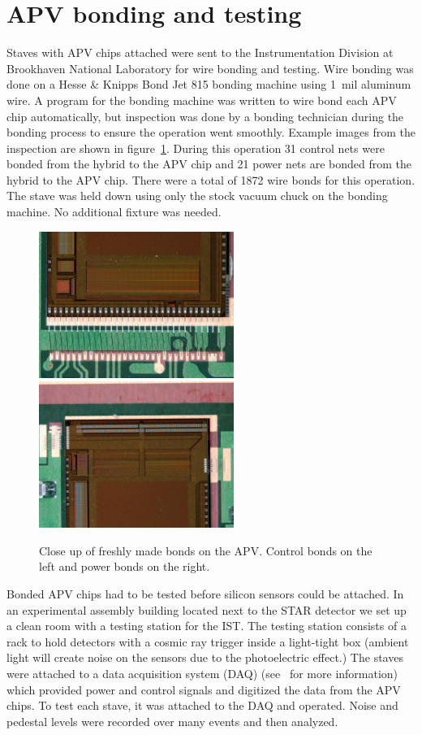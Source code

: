 \documentclass[preprint,12pt]{elsarticle}
\begin{document}
\section{APV bonding and testing}
Staves with APV chips attached were sent to the Instrumentation Division at
Brookhaven National Laboratory for wire bonding and testing. Wire bonding was
done on a Hesse \& Knipps Bond Jet 815 bonding machine using 1~mil aluminum
wire. A program for the bonding machine was written to wire bond each APV chip
automatically, but inspection was done by a bonding technician during the
bonding process to ensure the operation went smoothly.  Example images from the
inspection are shown in figure~\ref{fig:apv_bond}. During this
operation 31 control nets were bonded from the hybrid to the APV chip and 21
power nets are bonded from the hybrid to the APV chip. There were a total of 1872
wire bonds for this operation. The stave was held down using only the stock
vacuum chuck on the bonding machine. No additional fixture was needed.

\begin{figure}[h]
\begin{center}
\includegraphics[width=2.5in, keepaspectratio=true, angle=0]{graphics/control.jpg}
\includegraphics[width=2.5in, keepaspectratio=true, angle=0]{graphics/power.jpg}
\caption{Close up of freshly made bonds on the APV.  Control bonds on the left
and power bonds on the right.
\label{fig:apv_bond}}
\end{center}
\end{figure}
%
Bonded APV chips had to be tested before silicon sensors could be attached. In an
experimental assembly building located next to the STAR detector we set up a
clean room with a testing station for the IST. The testing station consists of
a rack to hold detectors with a cosmic ray trigger inside a light-tight box
(ambient light will create noise on the sensors due to the photoelectric effect.)
The staves were attached to a data acquisition system (DAQ) (see~\cite{ref:daq} for more information)
which provided power and control signals and digitized the data from the APV
chips. To test each stave, it was attached to the DAQ and operated. Noise and pedestal levels
were recorded over many events and then analyzed.
\end{document}
